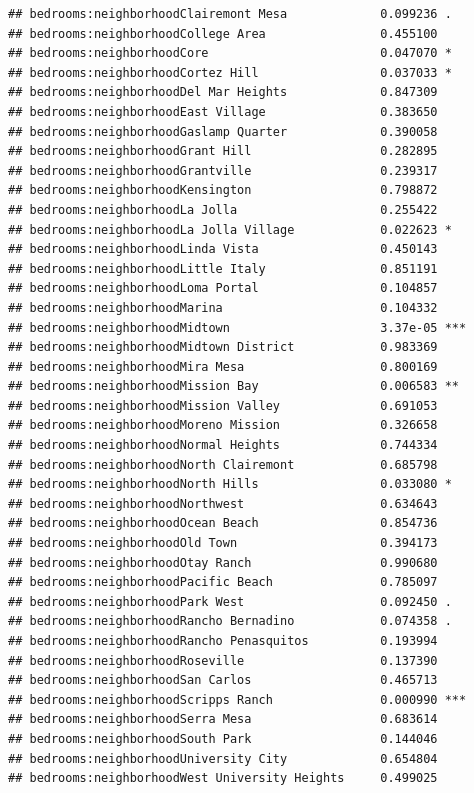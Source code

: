 \documentclass[
]{book}
\begin{document}
\begin{verbatim}
## bedrooms:neighborhoodClairemont Mesa             0.099236 .  
## bedrooms:neighborhoodCollege Area                0.455100    
## bedrooms:neighborhoodCore                        0.047070 *  
## bedrooms:neighborhoodCortez Hill                 0.037033 *  
## bedrooms:neighborhoodDel Mar Heights             0.847309    
## bedrooms:neighborhoodEast Village                0.383650    
## bedrooms:neighborhoodGaslamp Quarter             0.390058    
## bedrooms:neighborhoodGrant Hill                  0.282895    
## bedrooms:neighborhoodGrantville                  0.239317    
## bedrooms:neighborhoodKensington                  0.798872    
## bedrooms:neighborhoodLa Jolla                    0.255422    
## bedrooms:neighborhoodLa Jolla Village            0.022623 *  
## bedrooms:neighborhoodLinda Vista                 0.450143    
## bedrooms:neighborhoodLittle Italy                0.851191    
## bedrooms:neighborhoodLoma Portal                 0.104857    
## bedrooms:neighborhoodMarina                      0.104332    
## bedrooms:neighborhoodMidtown                     3.37e-05 ***
## bedrooms:neighborhoodMidtown District            0.983369    
## bedrooms:neighborhoodMira Mesa                   0.800169    
## bedrooms:neighborhoodMission Bay                 0.006583 ** 
## bedrooms:neighborhoodMission Valley              0.691053    
## bedrooms:neighborhoodMoreno Mission              0.326658    
## bedrooms:neighborhoodNormal Heights              0.744334    
## bedrooms:neighborhoodNorth Clairemont            0.685798    
## bedrooms:neighborhoodNorth Hills                 0.033080 *  
## bedrooms:neighborhoodNorthwest                   0.634643    
## bedrooms:neighborhoodOcean Beach                 0.854736    
## bedrooms:neighborhoodOld Town                    0.394173    
## bedrooms:neighborhoodOtay Ranch                  0.990680    
## bedrooms:neighborhoodPacific Beach               0.785097    
## bedrooms:neighborhoodPark West                   0.092450 .  
## bedrooms:neighborhoodRancho Bernadino            0.074358 .  
## bedrooms:neighborhoodRancho Penasquitos          0.193994    
## bedrooms:neighborhoodRoseville                   0.137390    
## bedrooms:neighborhoodSan Carlos                  0.465713    
## bedrooms:neighborhoodScripps Ranch               0.000990 ***
## bedrooms:neighborhoodSerra Mesa                  0.683614    
## bedrooms:neighborhoodSouth Park                  0.144046    
## bedrooms:neighborhoodUniversity City             0.654804    
## bedrooms:neighborhoodWest University Heights     0.499025    

\end{verbatim}
\end{document}
